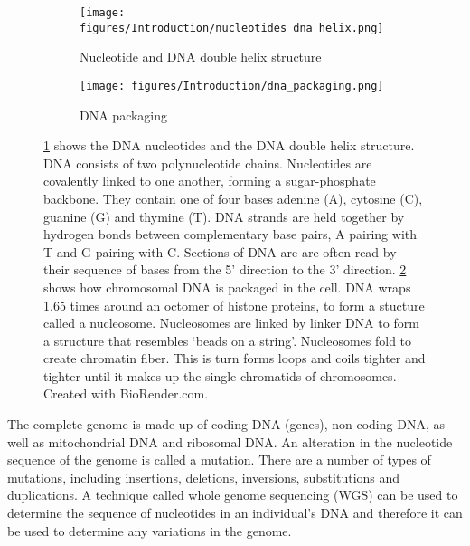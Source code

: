 \begin{figure}[htb]
\begin{subfigure}[t]{0.5\textwidth}
    \texttt{[image: figures/Introduction/nucleotides\_dna\_helix.png]}
    \caption{Nucleotide and DNA double helix structure}
    \label{fig:base_pairs}
\end{subfigure}
\begin{subfigure}[t]{0.5\textwidth}
    \texttt{[image: figures/Introduction/dna\_packaging.png]}
    \caption{DNA packaging}
    \label{fig:DNA_packaging}
\end{subfigure}
    \caption[DNA stucture and packaging.]{\ref{fig:base_pairs} shows the DNA nucleotides and the DNA double helix structure.
    DNA consists of two polynucleotide chains.
    Nucleotides are covalently linked to one another, forming a sugar-phosphate backbone.
    They contain one of four bases adenine (A), cytosine (C), guanine (G) and thymine (T).
    DNA strands are held together by hydrogen bonds between complementary base pairs, A pairing with T and G pairing with C\@.
    Sections of DNA are are often read by their sequence of bases from the 5' direction to the 3' direction.
    \ref{fig:DNA_packaging} shows how chromosomal DNA is packaged in the cell.
    DNA wraps 1.65 times around an octomer of histone proteins, to form a stucture called a nucleosome.
    Nucleosomes are linked by linker DNA to form a structure that resembles `beads on a string'.
    Nucleosomes fold to create chromatin fiber.
    This is turn forms loops and coils tighter and tighter until it makes up the single chromatids of chromosomes.
    \\\hspace{\textwidth}Created with BioRender.com.
    }
\label{fig:DNA_structure_packaging}
\end{figure}

The complete genome is made up of coding DNA (genes), non-coding DNA, as well as mitochondrial DNA and ribosomal DNA\@.
An alteration in the nucleotide sequence of the genome is called a mutation.
There are a number of types of mutations, including insertions, deletions, inversions, substitutions and duplications.
A technique called whole genome sequencing (WGS) can be used to determine the sequence of nucleotides in an individual's DNA and therefore it can be used to determine any variations in the genome.

